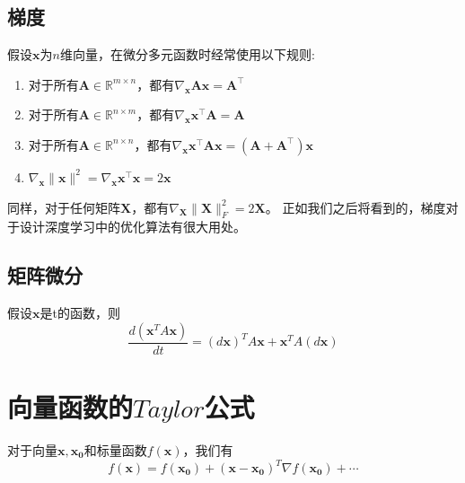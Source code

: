 \documentclass[lang=cn,10pt]{elegantbook}
\newcommand\bv[1]{\boldsymbol{#1}}
\begin{document}
\subsection{梯度}

\begin{theorem}
	假设$\mathbf{x}$为$n$维向量，在微分多元函数时经常使用以下规则:
	\begin{enumerate}[1、]
		\item     对于所有$\mathbf{A} \in \mathbb{R}^{m \times n}$，都有$\nabla_{\mathbf{x}} \mathbf{A} \mathbf{x} = \mathbf{A}^\top$
		\item 对于所有$\mathbf{A} \in \mathbb{R}^{n \times m}$，都有$\nabla_{\mathbf{x}} \mathbf{x}^\top \mathbf{A}  = \mathbf{A}$
		\item 对于所有$\mathbf{A} \in \mathbb{R}^{n \times n}$，都有$\nabla_{\mathbf{x}} \mathbf{x}^\top \mathbf{A} \mathbf{x}  = (\mathbf{A} + \mathbf{A}^\top)\mathbf{x}$
		\item $\nabla_{\mathbf{x}} \|\mathbf{x} \|^2 = \nabla_{\mathbf{x}} \mathbf{x}^\top \mathbf{x} = 2\mathbf{x}$
	\end{enumerate}
\end{theorem}

同样，对于任何矩阵$\mathbf{X}$，都有$\nabla_{\mathbf{X}} \|\mathbf{X} \|_F^2 = 2\mathbf{X}$。
正如我们之后将看到的，梯度对于设计深度学习中的优化算法有很大用处。

\subsection{矩阵微分}
\begin{corollary}
	假设$\mathbf{x}$是t的函数，则
	\begin{equation}
		\frac{d(\mathbf{x}^TA\mathbf{x})}{dt} = (d\mathbf{x})^TA\mathbf{x} + \mathbf{x}^TA(d\mathbf{x})
	\end{equation}
\end{corollary}



\section{向量函数的$Taylor$公式}\label{eq4.1}
对于向量$\bv{x,x_0}$和标量函数$f(\bv{x})$，我们有
\begin{equation}
	f(\bv{x}) = f(\bv{x_0}) + (\bv{x-x_0})^T\nabla f(\bv{x_0}) + \cdots
\end{equation}
\end{document}
